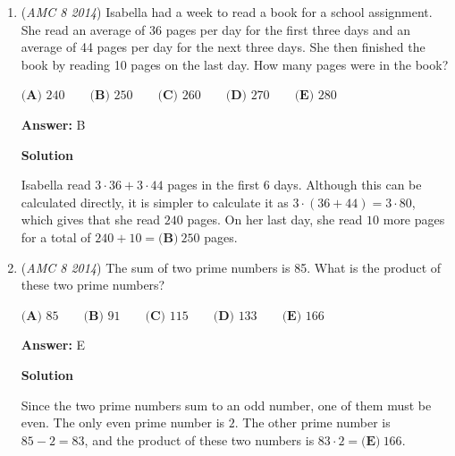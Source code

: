 \begin{enumerate}
\textbf{Solution}

The fewest amount of coins that can be used is $2$ (a quarter and a dime). The greatest amount is $7$, if he only uses nickels. Therefore we have $7-2=\boxed{\textbf{(E)}~5}$.

 



\textbf{Solution 2}

Quarter and Dime 2 coins                      All nickels 35/5 = 7 coins

 \begin{verbatim}
			7 coins - 2 coins = 5 coins
\end{verbatim}

-JasonDaGoat

 


 


	\item (\textit{AMC 8 2014}) Isabella had a week to read a book for a school assignment. She read an average of 36 pages per day for the first three days and an average of 44 pages per day for the next three days. She then finished the book by reading 10 pages on the last day. How many pages were in the book?


 $\textbf{(A) }240\qquad\textbf{(B) }250\qquad\textbf{(C) }260\qquad\textbf{(D) }270\qquad \textbf{(E) }280$

 \textbf{Answer: }B



\textbf{Solution}

Isabella read $3\cdot 36+3\cdot 44$ pages in the first 6 days. Although this can be calculated directly, it is simpler to calculate it as $3\cdot (36+44)=3\cdot 80$, which gives that she read $240$ pages. On her last day, she read $10$ more pages for a total of $240+10=\boxed{\textbf{(B)}~250}$ pages.

 


 


	\item (\textit{AMC 8 2014}) The sum of two prime numbers is 85. What is the product of these two prime numbers?


 $\textbf{(A) }85\qquad\textbf{(B) }91\qquad\textbf{(C) }115\qquad\textbf{(D) }133\qquad \textbf{(E) }166$

 \textbf{Answer: }E



\textbf{Solution}

Since the two prime numbers sum to an odd number, one of them must be even. The only even prime number is $2$. The other prime number is $85-2=83$, and the product of these two numbers is $83\cdot2=\boxed{\textbf{(E)}~166}$.


\end{enumerate}
